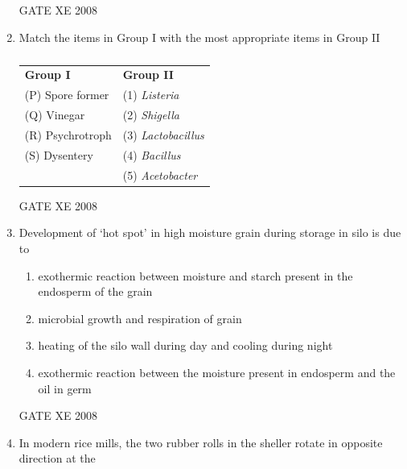 \documentclass[12pt]{article}
\begin{document}
\begin{enumerate}[label=Q\arabic*.]
GATE XE 2008

\item Match the items in Group I with the most appropriate items in Group II  

\begin{table}[H]     \centering     \caption{}     \label{}     \begin{tabular}{l l}

\textbf{Group I} & \textbf{Group II} \\
(P) Spore former & (1) \textit{Listeria} \\
(Q) Vinegar & (2) \textit{Shigella} \\
(R) Psychrotroph & (3) \textit{Lactobacillus} \\
(S) Dysentery & (4) \textit{Bacillus} \\
 & (5) \textit{Acetobacter} \\
\end{tabular} \end{table}  

\begin{enumerate}[label=(\Alph*)]
\end{enumerate}

GATE XE 2008

\item Development of ‘hot spot’ in high moisture grain during storage in silo is due to  

\begin{enumerate}[label=(\Alph*)]
\item  exothermic reaction between moisture and starch present in the endosperm of the grain 
\item  microbial growth and respiration of grain 
\item  heating of the silo wall during day and cooling during night 
\item  exothermic reaction between the moisture present in endosperm and the oil in germ 
\end{enumerate}

GATE XE 2008

\item In modern rice mills, the two rubber rolls in the sheller rotate in opposite direction at the  


\end{enumerate}
\end{document}

